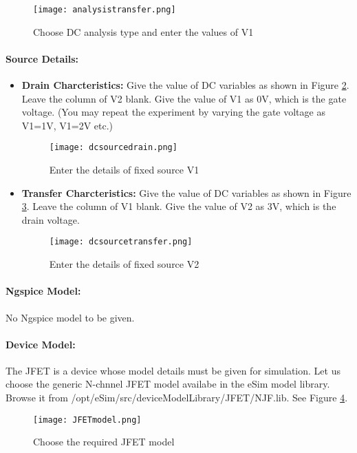 \begin{figure}[h]
\centering
\texttt{[image: analysistransfer.png]}
\caption{Choose DC analysis type and enter the values of V1}
\label{analysistransfer}
\end{figure}
\paragraph{Source Details:} 
\begin{itemize}
\item \textbf{Drain Charcteristics:} Give the value of DC variables as shown in Figure \ref{dcsourcedrain}. Leave the column of V2 blank. Give the value of V1 as 0V, which is the gate voltage. (You may repeat the experiment by varying the gate voltage as V1=1V, V1=2V etc.)
\begin{figure}[h]
\centering
\texttt{[image: dcsourcedrain.png]}
\caption{Enter the details of fixed source V1}
\label{dcsourcedrain}
\end{figure}

\item \textbf{Transfer Charcteristics:} Give the value of DC variables as shown in Figure \ref{dcsourcetransfer}. Leave the column of V1 blank. Give the value of V2 as 3V, which is the drain voltage. 
\begin{figure}[h]
\centering
\texttt{[image: dcsourcetransfer.png]}
\caption{Enter the details of fixed source V2}
\label{dcsourcetransfer}
\end{figure}

\end{itemize}

\paragraph{Ngspice Model:} No Ngspice model to be given.

\paragraph{Device Model:} The JFET is a device whose model details must be given for simulation. Let us choose the generic N-chnnel JFET model availabe in the eSim model library. Browse it from /opt/eSim/src/deviceModelLibrary/JFET/NJF.lib. See Figure \ref{JFETmodel}.
\begin{figure}[h]
\centering
\texttt{[image: JFETmodel.png]}
\caption{Choose the required JFET model}
\label{JFETmodel}
\end{figure}

